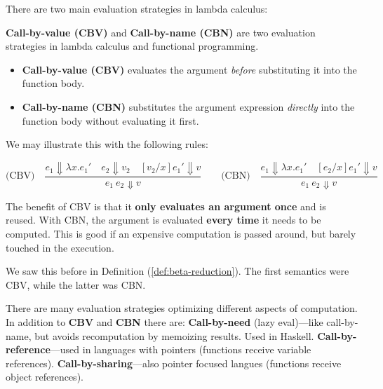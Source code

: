 \noindent
There are two main evaluation strategies in lambda calculus:
\begin{Def}

    \textbf{Call-by-value (CBV)} and \textbf{Call-by-name (CBN)} are two evaluation strategies in lambda calculus and functional programming.
    
    \begin{itemize}
        \item \textbf{Call-by-value (CBV)} evaluates the argument \emph{before} substituting it into the function body.
        \item \textbf{Call-by-name (CBN)} substitutes the argument expression \emph{directly} into the function body without evaluating it first.
    \end{itemize}
    
    \noindent 
    We may illustrate this with the following rules:
    
    \[
    \text{(CBV)} \quad
    \frac{
    e_1 \Downarrow \lambda x. e_1'
    \quad
    e_2 \Downarrow v_2
    \quad
    [v_2/x]e_1' \Downarrow v
    }{
    e_1\ e_2 \Downarrow v
    }
    \quad\quad
    \text{(CBN)} \quad
    \frac{
    e_1 \Downarrow \lambda x. e_1'
    \quad
    [e_2/x]e_1' \Downarrow v
    }{
    e_1\ e_2 \Downarrow v
    }
    \]
    
    \noindent
    The benefit of CBV is that it \textbf{only evaluates an argument once} and is reused. With 
    CBN, the argument is evaluated \textbf{every time} it needs to be computed. This is good if 
    an expensive computation is passed around, but barely touched in the execution.
    \end{Def}

    \noindent 
    We saw this before in Definition (\ref{def:beta-reduction}). The first semantics were CBV, while the latter was CBN.
    
    \begin{Tip} There are many evaluation strategies optimizing different aspects of computation. In addition to \textbf{CBV} and \textbf{CBN} there are:
    \textbf{Call-by-need} (lazy eval)---like call-by-name, but avoids recomputation by memoizing results. Used in Haskell.
    \textbf{Call-by-reference}---used in languages with pointers (functions receive variable references).
    \textbf{Call-by-sharing}---also pointer focused langues (functions receive object references).

\end{Tip}
        

